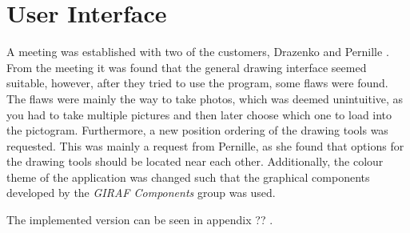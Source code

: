 \section{User Interface}
A meeting was established with two of the customers, Drazenko and Pernille \citep{misc:drazenko, misc:pernille}.
From the meeting it was found that the general drawing interface seemed suitable, however, after they tried to use the program, some flaws were found.
The flaws were mainly the way to take photos, which was deemed unintuitive, as you had to take multiple pictures and then later choose which one to load into the pictogram.
Furthermore, a new position ordering of the drawing tools was requested.
This was mainly a request from Pernille, as she found that options for the drawing tools should be located near each other.
Additionally, the colour theme of the application was changed such that the graphical components developed by the \textit{GIRAF Components} group was used.

The implemented version can be seen in appendix ?? .


